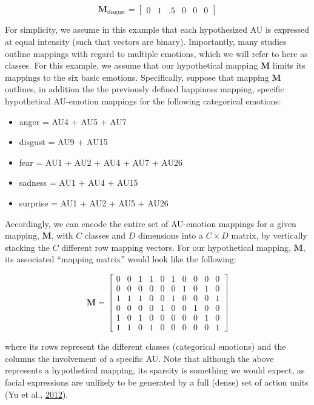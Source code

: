 \documentclass[11pt,american,a4paper,oneside,]{memoir} %
\providecommand{\tightlist}{%
  \setlength{\itemsep}{0pt}\setlength{\parskip}{0pt}}
\begin{document}
\begin{equation}
\mathbf{M}_{\mathrm{disgust}} = \begin{bmatrix} 0 & 1 & .5 & 0 & 0 & 0 \end{bmatrix}
\end{equation}

For simplicity, we assume in this example that each hypothesized AU is expressed at equal intensity (such that vectors are binary). Importantly, many studies outline mappings with regard to multiple emotions, which we will refer to here as classes. For this example, we assume that our hypothetical mapping \(\mathbf{M}\) limits its mappings to the six basic emotions. Specifically, suppose that mapping \(\mathbf{M}\) outlines, in addition the the previously defined happiness mapping, specific hypothetical AU-emotion mappings for the following categorical emotions:

\begin{itemize}
\tightlist
\item
  anger = AU4 + AU5 + AU7
\item
  disgust = AU9 + AU15
\item
  fear = AU1 + AU2 + AU4 + AU7 + AU26
\item
  sadness = AU1 + AU4 + AU15
\item
  surprise = AU1 + AU2 + AU5 + AU26
\end{itemize}

Accordingly, we can encode the entire set of AU-emotion mappings for a given mapping, \(\mathbf{M}\), with \(C\) classes and \(D\) dimensions into a \(C \times D\) matrix, by vertically stacking the \(C\) different row mapping vectors. For our hypothetical mapping, \(\mathbf{M}\), its associated ``mapping matrix'' would look like the following:

\begin{equation}
\mathbf{M} = \begin{bmatrix}
0 & 0 & 1 & 1 & 0 & 1 & 0 & 0 & 0 & 0 \\
0 & 0 & 0 & 0 & 0 & 0 & 1 & 0 & 1 & 0 \\
1 & 1 & 1 & 0 & 0 & 1 & 0 & 0 & 0 & 1 \\
0 & 0 & 0 & 0 & 1 & 0 & 0 & 1 & 0 & 0 \\
1 & 0 & 1 & 0 & 0 & 0 & 0 & 0 & 1 & 0 \\
1 & 1 & 0 & 1 & 0 & 0 & 0 & 0 & 0 & 1
\end{bmatrix}
\end{equation}

where its rows represent the different classes (categorical emotions) and the columns the involvement of a specific AU. Note that although the above represents a hypothetical mapping, its sparsity is something we would expect, as facial expressions are unlikely to be generated by a full (dense) set of action units (Yu et al., \protect\hyperlink{ref-Yu2012-ag}{2012}).
\end{document}
